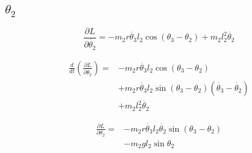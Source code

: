 \documentclass[titlepage]{article}
\numberwithin{equation}{section}
\begin{document}
\subsection{$\theta_2$}
\begin{equation}
\frac{\partial L}{\partial \dot{\theta_2}} = - m_2 r \dot{\theta_3} l_2 \cos{(\theta_3 - \theta_2)} + m_2 l_2^2 \dot{\theta_2}
\end{equation}

\begin{align}
\frac{d}{dt} \left(\frac{\partial L}{\partial \dot{\theta_2}}\right) = &- m_2 r \ddot{\theta_3} l_2 \cos{(\theta_3 - \theta_2)} \nonumber \\
 &+ m_2 r \dot{\theta_3} l_2 \sin{(\theta_3 - \theta_2)} (\dot{\theta_3} - \dot{\theta_2}) \nonumber \\
 &+ m_2 l_2^2 \ddot{\theta_2} \label{eq:LE_left_t2}
\end{align}

\begin{align}
\frac{\partial L}{\partial \theta_2} = &- m_2 r \dot{\theta_3} l_2 \dot{\theta_2} \sin{(\theta_3 - \theta_2)} \nonumber \\
 &- m_2 g l_2 \sin \theta_2 \label{eq:LE_right_t2}
\end{align}
\end{document}
